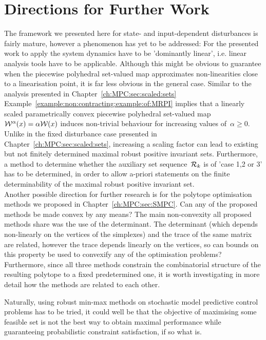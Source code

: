 \section{Directions for Further Work}
%
%
%
The framework we presented here for state- and input-dependent disturbances is fairly mature, however a phenomenon has yet to be addressed:
%
For the presented work to apply the system dynamics have to be 'dominantly linear', i.e. linear analysis tools have to be applicable.
%
Although this might be obvious to guarantee when the piecewise polyhedral set-valued map approximates non-linearities close to a linearisation point, it is far less obvious in the general case.
%
Similar to the analysis presented in Chapter~\ref{ch:MPC:sec:scaled:sets} Example~\ref{example:non:contracting:example:of:MRPI} implies that a linearly scaled parametrically convex piecewise polyhedral set-valued map~$\mathcal W^\alpha(x)=\alpha\mathcal W(x)$ induces non-trivial behaviour for increasing values of~$\alpha\geq0$.
%
Unlike in the fixed disturbance case presented in Chapter~\ref{ch:MPC:sec:scaled:sets}, increasing a scaling factor can lead to existing but not finitely determined maximal robust positive invariant sets.
%
Furthermore, a method to determine whether the auxiliary set sequence~$\mathcal R_k$ is of 'case 1,2 or 3' has to be determined, in order to allow a-priori statements on the finite determinability of the maximal robust positive invariant set.
%
\\[1em]
%
Another possible direction for further research is for the polytope optimisation methods we proposed in Chapter~\ref{ch:MPC:sec:SMPC}.
%
Can any of the proposed methods be made convex by any means? 
%
The main non-convexity all proposed methods share was the use of the determinant.
%
The determinant (which depends non-linearly on the vertices of the simplexes) and the trace of the same matrix are related, however the trace depends linearly on the vertices, so can bounds on this property be used to convexify any of the optimisation problems?
%
Furthermore, since all three methods constrain the combinatorial structure of the resulting polytope to a fixed predetermined one, it is worth investigating in more detail how the methods are related to each other.
%
\par Naturally, using robust min-max methods on stochastic model predictive control problems has to be tried, it could well be that the objective of maximising some feasible set is not the best way to obtain maximal performance while guaranteeing probabilistic constraint satisfaction, if so what is.